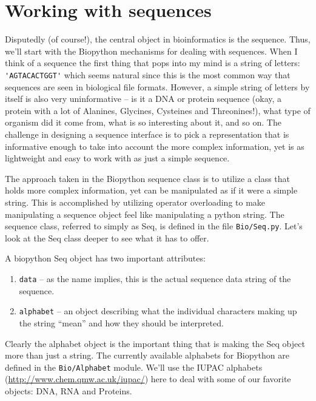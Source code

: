 \documentclass{report}
\begin{document}
\section{Working with sequences}
\label{sec:sequences}

Disputedly (of course!), the central object in bioinformatics is the sequence. Thus, we'll start with the Biopython mechanisms for dealing with sequences. When I think of a sequence the first thing that pops into my mind is a string of letters:\verb| 'AGTACACTGGT'| which seems natural since this is the most common way that sequences are seen in biological file formats.  However, a simple string of letters by itself is also very uninformative -- is it a DNA or  protein sequence (okay, a protein with a lot of Alanines, Glycines, Cysteines and Threonines!), what type of organism did it come from, what is so interesting about it, and so on. The challenge in designing a sequence interface is to pick a representation that is informative enough to take into account the more complex information, yet is as lightweight and easy to work with as just a simple sequence.


The approach taken in the Biopython sequence class is to utilize a class that holds more complex information, yet can be manipulated as if it were a simple string. This is accomplished by utilizing operator overloading to make manipulating a sequence object feel like manipulating a python string. The sequence class, referred to simply as Seq,  is defined in the file \verb|Bio/Seq.py|. Let's look at the Seq class deeper to see what it has to offer.


A biopython Seq object has two important attributes:

\begin{enumerate}

\item \verb|data| -- as the name implies, this is the actual sequence data string of the sequence.

\item \verb|alphabet| -- an object describing what the individual characters making up the string ``mean'' and how they should be interpreted.

\end{enumerate}

Clearly the alphabet object is the important thing that is making the Seq object more than just a string. The currently available alphabets for Biopython are defined in the \verb|Bio/Alphabet| module. We'll use the IUPAC alphabets (\url{http://www.chem.qmw.ac.uk/iupac/}) here to deal with some of our favorite objects: DNA, RNA and Proteins.  
\end{document}
